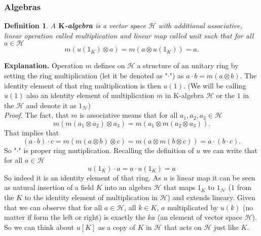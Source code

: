 \documentclass[a4paper]{article}
\newtheorem{definition}{Definition}
\begin{document}
\subsubsection{Algebras}
\begin{definition}
A \textbf{$\textbf{K}$-algebra} is a vector space $\mathcal{H}$ with additional
associative, linear operation
 called multiplication and linear map
 called unit such that for all $a \in \mathcal{H}$
\begin{equation*}
m(u(1_K) \otimes a) = m(a \otimes u(1_K)) = a.
\end{equation*}
\end{definition}
\textbf{Explanation. } Operation $m$ defines on $\mathcal{H}$ a structure of an unitary ring by setting the
ring multiplication (let it be denoted as "$\cdot$") as $a \cdot b = m(a \otimes b)$. The identity element of
that ring multiplication is then $u(1)$. (We will be calling $u(1)$ also an identity element of
multiplication $m$ in K-algebra $\mathcal{H}$ or the $1$ in the $\mathcal{H}$ and 
denote it as $1_\mathcal{H}$)\\
\textit{Proof.} The fact, that $m$ is associative means that for all $a_1, a_2, a_3 \in \mathcal{H}$
\begin{equation*}
m(m(a_1 \otimes a_2) \otimes a_3) = m(a_1 \otimes m(a_2 \otimes a_3)).
\end{equation*}
That implies that
\begin{equation*}
(a\cdot b) \cdot c = m(m(a \otimes b) \otimes c) = m(a \otimes m(b \otimes c)) = a \cdot (b \cdot c).
\end{equation*}
So "$\cdot$" is proper ring mutiplication. Recalling the definition of $u$ we can write that for all 
$a \in \mathcal{H}$
\begin{equation*}
u(1_K) \cdot a = a \cdot u(1_K) = a
\end{equation*}
So indeed it is an identity
element of that ring. As $u$ is linear map it can be seen as natural insertion of a field $K$ into an algebra
$\mathcal{H}$ that maps $1_K$ to $1_\mathcal{H}$ ($1$ from the $K$ to the identity element of multiplication
in $\mathcal{H}$) and extends lineary. Given that we can observe
that for all $a \in \mathcal{H}$, all $k \in K$, $a$ multiplicated by $u(k)$ (no matter if form the left
or right) is exactly the $ka$ (an element of vector space $\mathcal{H}$).
So we can think about $u[K]$ as a copy of $K$ in $\mathcal{H}$ that acts on $\mathcal{H}$ just like $K$.\\
\end{document}
